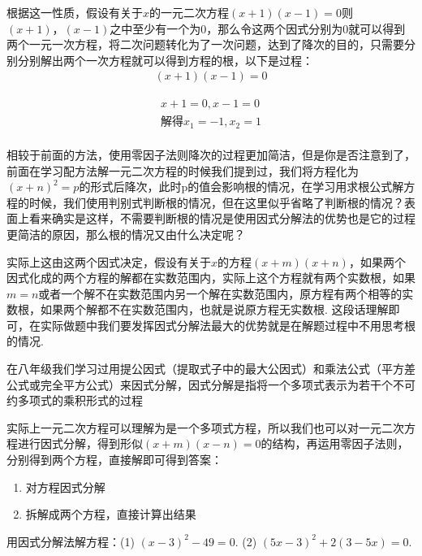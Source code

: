 \documentclass[lang=cn, 10pt, titlestyle=display, oneside]{elegantbook}
\begin{document}
根据这一性质，假设有关于\(x\)的一元二次方程\((x+1)(x-1)=0\)则\((x+1)，(x-1)\)之中至少有一个为0，那么令这两个因式分别为0就可以得到两个一元一次方程，将二次问题转化为了一次问题，达到了降次的目的，只需要分别分别解出两个一次方程就可以得到方程的根，以下是过程：
\begin{align*}
    (x+1)(x-1)=0
\end{align*}
\begin{solution}
    \begin{align*}
        x+1=0, x-1=0\\
        解得x_1=-1,x_2=1\\
    \end{align*}
\end{solution}
相较于前面的方法，使用零因子法则降次的过程更加简洁，但是你是否注意到了，前面在学习配方法解一元二次方程的时候我们提到过，我们将方程化为\((x+n)^2=p\)的形式后降次，此时p的值会影响根的情况，在学习用求根公式解方程的时候，我们使用判别式判断根的情况，但在这里似乎省略了判断根的情况？表面上看来确实是这样，不需要判断根的情况是使用因式分解法的优势也是它的过程更简洁的原因，那么根的情况又由什么决定呢？
\par
实际上这由这两个因式决定，假设有关于\(x\)的方程\((x+m)(x+n)\)，如果两个因式化成的两个方程的解都在实数范围内，实际上这个方程就有两个实数根，如果\(m=n\)或者一个解不在实数范围内另一个解在实数范围内，原方程有两个相等的实数根，如果两个解都不在实数范围内，也就是说原方程无实数根. 这段话理解即可，在实际做题中我们要发挥因式分解法最大的优势就是在解题过程中不用思考根的情况.

在八年级我们学习过用提公因式（提取式子中的最大公因式）和乘法公式（平方差公式或完全平方公式）来因式分解，因式分解是指将一个多项式表示为若干个不可约多项式的乘积形式的过程
\par
实际上一元二次方程可以理解为是一个多项式方程，所以我们也可以对一元二次方程进行因式分解，得到形似\((x+m)(x-n)=0\)的结构，再运用零因子法则，分别得到两个方程，直接解即可得到答案：

\begin{enumerate}
    \item 对方程因式分解
    \item 拆解成两个方程，直接计算出结果
\end{enumerate}



\begin{example}
    用因式分解法解方程：(1) \((x-3)^2-49=0\). (2) \((5x-3)^2+2(3-5x)=0\).
\end{example}
\end{document}
